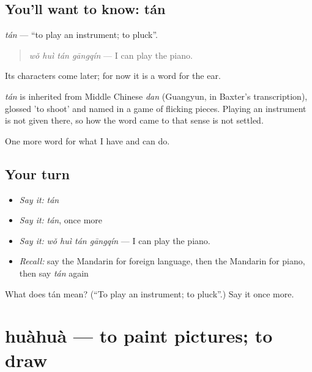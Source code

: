 \subsection*{You'll want to know: tán}
\emph{tán} — \textquotedblleft{}to play an instrument; to pluck\textquotedblright{}.

\begin{quote}
\emph{wǒ huì tán gāngqín} — I can play the piano.
\end{quote}

Its characters come later; for now it is a word for the ear.

\begin{cousinweb}
\emph{tán} is inherited from Middle Chinese \emph{dan} (Guangyun, in Baxter's transcription), glossed 'to shoot' and named in a game of flicking pieces. Playing an instrument is not given there, so how the word came to that sense is not settled.
\end{cousinweb}

\begin{grammarlens}[title={What you've built}]
One more word for what I have and can do.
\end{grammarlens}

\subsection*{Your turn}
\begin{itemize}
\raggedright
  \item \emph{Say it:} \emph{tán}
  \item \emph{Say it:} \emph{tán}, once more
  \item \emph{Say it:} \emph{wǒ huì tán gāngqín} — I can play the piano.
  \item \emph{Recall:} say the Mandarin for foreign language, then the Mandarin for piano, then say \emph{tán} again
\end{itemize}

\begin{tcolorbox}[breakable,colback=teal!4,colframe=teal!35!black,title={Before you move on}]
What does tán mean? (\textquotedblleft{}To play an instrument; to pluck\textquotedblright{}.) Say it once more.
\end{tcolorbox}
\section[huàhuà]{huàhuà — to paint pictures; to draw}

\label{lesson:ZH-C110-huahua}



